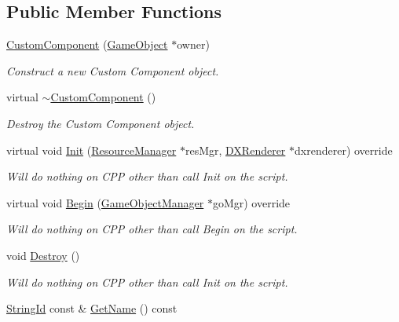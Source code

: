 \subsection*{Public Member Functions}
\begin{DoxyCompactItemize}
\item 
\hyperlink{classCustomComponent_a748e48455ac06076251485d3a112140f}{Custom\+Component} (\hyperlink{classGameObject}{Game\+Object} $\ast$owner)
\begin{DoxyCompactList}\small\item\em Construct a new Custom Component object. \end{DoxyCompactList}\item 
\mbox{\label{classCustomComponent_a79668a223e3efff11c27180ac90959c0}} 
virtual \hyperlink{classCustomComponent_a79668a223e3efff11c27180ac90959c0}{$\sim$\+Custom\+Component} ()
\begin{DoxyCompactList}\small\item\em Destroy the Custom Component object. \end{DoxyCompactList}\item 
virtual void \hyperlink{classCustomComponent_a614f2af8f444be376d83cc00f6b9c7ea}{Init} (\hyperlink{classResourceManager}{Resource\+Manager} $\ast$res\+Mgr, \hyperlink{classDXRenderer}{D\+X\+Renderer} $\ast$dxrenderer) override
\begin{DoxyCompactList}\small\item\em Will do nothing on C\+PP other than call Init on the script. \end{DoxyCompactList}\item 
virtual void \hyperlink{classCustomComponent_a4c2ecd49242b844479cbee2e9385371b}{Begin} (\hyperlink{classGameObjectManager}{Game\+Object\+Manager} $\ast$go\+Mgr) override
\begin{DoxyCompactList}\small\item\em Will do nothing on C\+PP other than call Begin on the script. \end{DoxyCompactList}\item 
void \hyperlink{classCustomComponent_a938c6db19be64cb1d83da8f9ae7ba4d1}{Destroy} ()
\begin{DoxyCompactList}\small\item\em Will do nothing on C\+PP other than call Init on the script. \end{DoxyCompactList}\item 
\hyperlink{classStringId}{String\+Id} const  \& \hyperlink{classCustomComponent_aefb68297be52020412723f27a3c003f0}{Get\+Name} () const

\end{DoxyCompactItemize}
